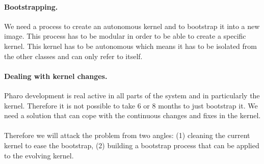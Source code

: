 \paragraph{Bootstrapping.} We need a process to create an autonomous kernel and to bootstrap it into a new image. This process has to be modular in order to be able to create a specific kernel.
This kernel has to be autonomous which means it has to be isolated from the other classes and can only refer to itself.

\paragraph{Dealing with kernel changes.}
Pharo development is real active in all parts of the system and in particularly the kernel. Therefore it is not possible to take 6 or 8 months to just bootstrap it.
We need a solution that can cope with the continuous changes and fixes in the kernel. 


\paragraph{}Therefore we will attack the problem from two angles: (1) cleaning the current kernel to ease the bootstrap, (2) building a bootstrap process that can be applied to the evolving kernel.